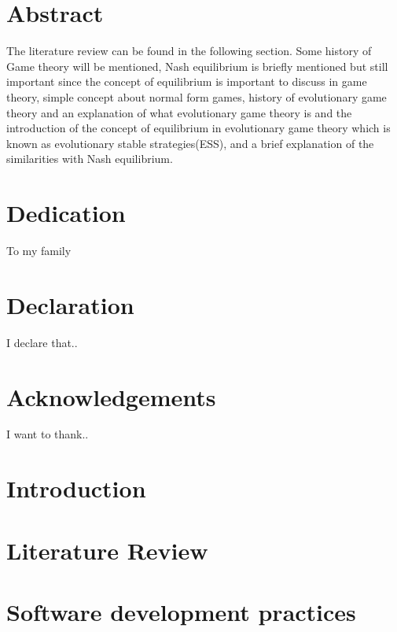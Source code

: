 \documentclass[12pt]{report}
\begin{document}
\thispagestyle{empty}




\thispagestyle{empty}
\chapter*{Abstract}
The literature review can be found in the following section. Some history of Game theory will be mentioned, Nash equilibrium is briefly mentioned but still important since the concept of equilibrium is important to discuss in game theory, simple concept about normal form games, history of evolutionary game theory and an explanation of what evolutionary game theory is and the introduction of the concept of equilibrium in evolutionary game theory which is known as evolutionary stable strategies(ESS), and a brief explanation of the similarities with Nash equilibrium.

\thispagestyle{empty}
\chapter*{Dedication}
To my family
\thispagestyle{empty}
\chapter*{Declaration}
I declare that..
\thispagestyle{empty}
\chapter*{Acknowledgements}
I want to thank..

\newpage
\thispagestyle{empty}
\tableofcontents

\newpage
\thispagestyle{empty}
\listoftables

\newpage
\thispagestyle{empty}
\listoffigures
 
\newpage
{}

\chapter{Introduction}


\chapter{Literature Review}


\chapter{Software development practices}

\end{document}
